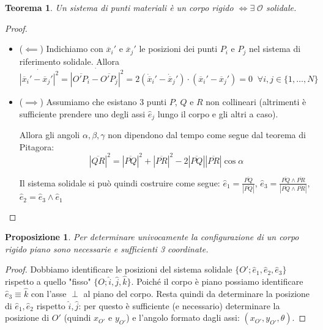 \documentclass{book}
\theoremstyle{plain}
\newtheorem{teo}{Teorema}[chapter]
\theoremstyle{plain}
\theoremstyle{plain}
\theoremstyle{plain}
\theoremstyle{plain}
\newtheorem{prop}{Proposizione}[chapter]
\theoremstyle{definition}
\theoremstyle{remark}
\theoremstyle{definition}
\begin{document}
\begin{teo}
    Un sistema di punti materiali è un corpo rigido $\iff \exists \; \mathcal{O}$ solidale.
\end{teo}

\begin{proof}

    \noindent
    \begin{itemize}
        \item ($\impliedby$) Indichiamo con $\overline{x}_i'$ e $\overline{x}_j'$ le posizioni dei punti $P_i$ e $P_j$ nel sistema di riferimento solidale. Allora $\Dot{\left|\overline{x}_i'-\overline{x}_j'\right|^2}=\Dot{\left|\overline{O'P_i}-\overline{O'P_j}\right|^2}=2(\Dot{\overline{x}}_i'-\Dot{\overline{x}}_j')\cdot(\overline{x}_i'-\overline{x}_j')=0 \;\;\forall i, j \in \{1,\ldots,N\}$
        \item ($\implies$) Assumiamo che esistano 3 punti $P$, $Q$ e $R$ non collineari (altrimenti è sufficiente prendere uno degli assi $\hat{e}_j$ lungo il corpo e gli altri a caso).
        
        \noindent Allora gli angoli $\alpha, \beta, \gamma$ non dipendono dal tempo come segue dal teorema di Pitagora:
        \begin{displaymath}
            |\overline{QR}|^2=|\overline{PQ}|^2+|\overline{PR}|^2-2|\overline{PQ}||\overline{PR}|\cos{\alpha}
        \end{displaymath}
        
        \noindent Il sistema solidale si può quindi costruire come segue: $\hat{e}_1=\frac{\overline{PQ}}{|\overline{PQ}|}$, $\hat{e}_3=\frac{\overline{PQ}\wedge\overline{PR}}{|\overline{PQ}\wedge\overline{PR}|}$, $\hat{e}_2=\hat{e}_3\wedge\hat{e}_1$
    \end{itemize}
\end{proof}

\begin{prop}
    Per determinare univocamente la configurazione di un corpo rigido piano sono necessarie e sufficienti 3 coordinate.
\end{prop}

\begin{proof}
    Dobbiamo identificare le posizioni del sistema solidale $\{O'; \hat{e}_1, \hat{e}_2, \hat{e}_3\}$ rispetto a quello "fisso" $\{O; \hat{i}, \hat{j}, \hat{k}\}$.
    Poiché il corpo è piano possiamo identificare $\hat{e}_3\equiv\hat{k}$ con l'asse $\perp$ al piano del corpo. Resta quindi da determinare la posizione di $\hat{e}_1, \hat{e}_2$ rispetto $\hat{i}, \hat{j}$: per questo è sufficiente (e necessario) determinare la posizione di $O'$ (quindi $x_{O'}$ e $y_{O'}$) e l'angolo formato dagli assi: $(x_{O'}, y_{O'}, \theta)$.
\end{proof}
\end{document}
